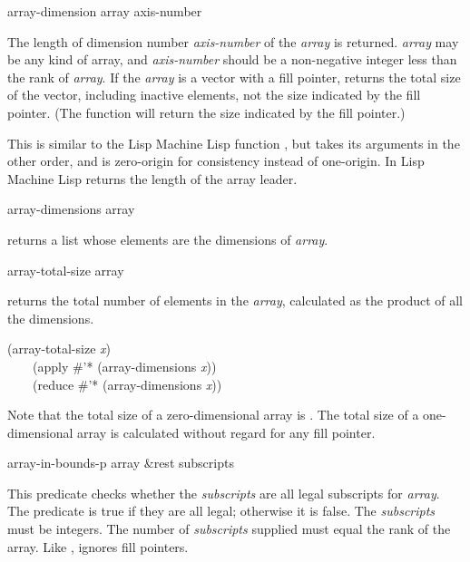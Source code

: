 \begin{defun}[Function]
array-dimension array axis-number

The length of dimension number {\it axis-number} of the {\it array} is returned.
{\it array} may be any kind of array, and {\it axis-number} should
be a non-negative integer less than the rank of {\it array}.
If the {\it array} is a vector with a fill pointer,
 returns the total size of the vector,
including inactive elements,
not the size indicated by the fill pointer.
(The function  will return the size indicated
by the fill pointer.)

\beforenoterule
\begin{incompatibility}
This is similar to the Lisp Machine Lisp function
, but takes its arguments in the other
order, and is zero-origin for consistency
instead of one-origin.  In Lisp Machine Lisp 
returns the length of the array leader.
\end{incompatibility}
\afternoterule
\end{defun}

\begin{defun}[Function]
array-dimensions array

 returns a list whose elements are the dimensions
of {\it array}.
\end{defun}

\begin{defun}[Function]
array-total-size array

 returns the total number of elements in the {\it array},
calculated as the product of all the dimensions.
\begin{lisp}
(array-total-size {\it x}) \\
~~~\EQ\ (apply \#'* (array-dimensions {\it x})) \\
~~~\EQ\ (reduce \#'* (array-dimensions {\it x}))
\end{lisp}
Note that the total size of a zero-dimensional array is .
The total size of a one-dimensional array is calculated without regard
for any fill pointer.
\end{defun}

\begin{defun}[Function]
array-in-bounds-p array &rest subscripts

This predicate checks whether the {\it subscripts} are all
legal subscripts for {\it array}.  The predicate is true if they
are all legal; otherwise it is false.  The {\it subscripts} must be integers.
The number of {\it subscripts} supplied must equal the rank of the array.
Like ,  ignores fill pointers.
\end{defun}

